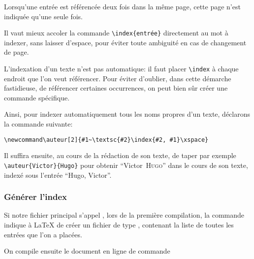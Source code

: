 
 Lorsqu'une entrée est référencée deux fois dans la même page, cette page n'est indiquée qu'une seule fois. 

\begin{attention}
Il vaut mieux accoler la commande \verb+\index{entrée}+ directement au  mot à indexer, sans laisser d'espace, pour éviter toute ambiguité en cas de changement de page.

\end{attention}

L'indexation d'un texte n'est pas automatique: il faut placer \verb+\index+ à chaque endroit  que l'on veut référencer. Pour éviter d'oublier, dans cette démarche fastidieuse, de référencer certaines occurrences, on  peut bien sûr créer une commande  spécifique.

Ainsi, pour indexer automatiquement tous les noms propres d'un texte, déclarons la commande suivante:
\begin{verbatim}
\newcommand\auteur[2]{#1~\textsc{#2}\index{#2, #1}\xspace}
\end{verbatim}
\renewcommand\auteur[2]{#1~\textsc{#2}\index{#2, #1}\xspace}

Il suffira ensuite, au cours de la rédaction de son texte, de taper par exemple \verb|\auteur{Victor}{Hugo}| pour obtenir \enquote{\auteur{Victor}{Hugo}} dans le cours de son texte, indexé sous l'entrée \enquote{Hugo, Victor}.


\subsubsection{Générer l'index}

Si notre fichier principal s'appel , lors de la première compilation, la commande  indique à \LaTeX{} de créer un fichier de type , contenant la liste de toutes les entrées que l'on a placées. 
 



On compile ensuite le document en ligne de commande 

